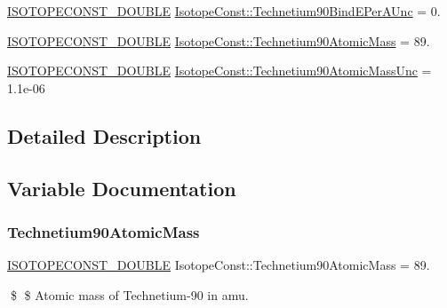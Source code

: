 \begin{DoxyCompactItemize}
\mbox{\hyperlink{group___isotope_const-_macros_ga8f45a7272ce02c0b4c65c44636ed719a}{I\+S\+O\+T\+O\+P\+E\+C\+O\+N\+S\+T\+\_\+\+D\+O\+U\+B\+LE}} \mbox{\hyperlink{group___isotope_const-_technetium-_tc90_ga72d9427e35adfda06dbeabb0c5d7988a}{Isotope\+Const\+::\+Technetium90\+Bind\+E\+Per\+A\+Unc}} = 0.
\item 
\mbox{\hyperlink{group___isotope_const-_macros_ga8f45a7272ce02c0b4c65c44636ed719a}{I\+S\+O\+T\+O\+P\+E\+C\+O\+N\+S\+T\+\_\+\+D\+O\+U\+B\+LE}} \mbox{\hyperlink{group___isotope_const-_technetium-_tc90_ga15fb2745d4e5e14d43e546a3cf7530d2}{Isotope\+Const\+::\+Technetium90\+Atomic\+Mass}} = 89.
\item 
\mbox{\hyperlink{group___isotope_const-_macros_ga8f45a7272ce02c0b4c65c44636ed719a}{I\+S\+O\+T\+O\+P\+E\+C\+O\+N\+S\+T\+\_\+\+D\+O\+U\+B\+LE}} \mbox{\hyperlink{group___isotope_const-_technetium-_tc90_gaf0971fdf6ebbd77faaa96a146ec822ad}{Isotope\+Const\+::\+Technetium90\+Atomic\+Mass\+Unc}} = 1.\+1e-\/06
\end{DoxyCompactItemize}


\subsection{Detailed Description}


\subsection{Variable Documentation}
\mbox{\label{group___isotope_const-_technetium-_tc90_ga15fb2745d4e5e14d43e546a3cf7530d2}} 
\subsubsection{\texorpdfstring{Technetium90\+Atomic\+Mass}{Technetium90AtomicMass}}
{\footnotesize\ttfamily \mbox{\hyperlink{group___isotope_const-_macros_ga8f45a7272ce02c0b4c65c44636ed719a}{I\+S\+O\+T\+O\+P\+E\+C\+O\+N\+S\+T\+\_\+\+D\+O\+U\+B\+LE}} Isotope\+Const\+::\+Technetium90\+Atomic\+Mass = 89.}

\$ \$ Atomic mass of Technetium-\/90 in amu. \mbox{\label{group___isotope_const-_technetium-_tc90_gaf0971fdf6ebbd77faaa96a146ec822ad}} 
